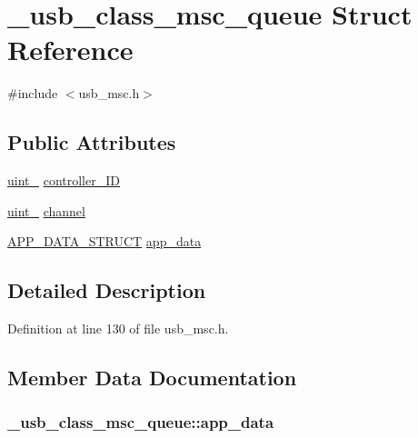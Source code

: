 \hypertarget{struct__usb__class__msc__queue}{}\section{\+\_\+usb\+\_\+class\+\_\+msc\+\_\+queue Struct Reference}
\label{struct__usb__class__msc__queue}


{\ttfamily \#include $<$usb\+\_\+msc.\+h$>$}

\subsection*{Public Attributes}
\begin{DoxyCompactItemize}
\item 
\hyperlink{types_8h_ad3209046c23f739a81581c10a4be7d92}{uint\+\_} \hyperlink{struct__usb__class__msc__queue_a53fdfed1c2949d468aa938771b4cb864}{controller\+\_\+\+ID}
\item 
\hyperlink{types_8h_ad3209046c23f739a81581c10a4be7d92}{uint\+\_} \hyperlink{struct__usb__class__msc__queue_a18a7ff1ffec780b13b9723f51ba3f48a}{channel}
\item 
\hyperlink{usb__framework_8h_ae3e64a604dc0ccbc8b12a63452c34968}{A\+P\+P\+\_\+\+D\+A\+T\+A\+\_\+\+S\+T\+R\+U\+CT} \hyperlink{struct__usb__class__msc__queue_a7f88bfa80c099a4c47ff7a9341506f7a}{app\+\_\+data}
\end{DoxyCompactItemize}


\subsection{Detailed Description}


Definition at line 130 of file usb\+\_\+msc.\+h.



\subsection{Member Data Documentation}
\subsubsection[{\texorpdfstring{app\+\_\+data}{app_data}}]{ \+\_\+usb\+\_\+class\+\_\+msc\+\_\+queue\+::app\+\_\+data}\hypertarget{struct__usb__class__msc__queue_a7f88bfa80c099a4c47ff7a9341506f7a}{}\label{struct__usb__class__msc__queue_a7f88bfa80c099a4c47ff7a9341506f7a}


